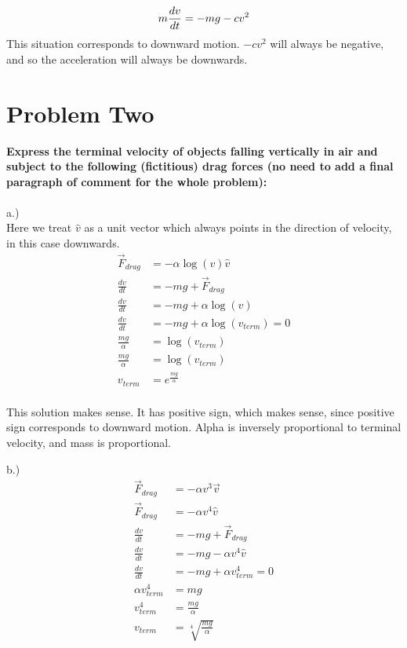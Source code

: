\documentclass[10pt]{article} %
\begin{document}
\begin{equation}
  m\frac{dv}{dt} = -mg - cv^2\\
\end{equation}
This situation corresponds to downward motion. $-cv^2$ will always be negative, and so the acceleration will always be downwards.\\

\vspace{1 cm}

\section{Problem Two}
\textbf{Express  the  terminal  velocity  of  objects  falling  vertically  in  air  and  subject to the following (fictitious) drag  forces (no need to add a  final paragraph of comment  for the whole problem):} \\ \\

a.)\\
Here we treat $\hat{v}$ as a unit vector which always points in the direction of velocity, in this case downwards.\\

\begin{align}
  \vec{F}_{drag} &= -\alpha\log(v)\hat{v}\\
  \frac{dv}{dt} &= -mg + \vec{F}_{drag}\\
  \frac{dv}{dt} &= -mg + \alpha\log(v)\\  
  \frac{dv}{dt} &= -mg + \alpha\log(v_{term}) = 0\\
  \frac{mg}{\alpha} &= \log(v_{term})\\
  \frac{mg}{\alpha} &= \log(v_{term})\\
  v_{term} &= e^{\frac{mg}{\alpha}}\\
\end{align}

This solution makes sense. It has positive sign, which makes sense, since positive sign corresponds to downward motion. Alpha is inversely proportional to terminal velocity, and mass is proportional.

b.)
\begin{align}
  \vec{F}_{drag} &= -\alpha v^3\vec{v}\\
  \vec{F}_{drag} &= -\alpha v^4\hat{v}\\  
  \frac{dv}{dt} &= -mg + \vec{F}_{drag}\\
  \frac{dv}{dt} &= -mg -\alpha v^4\hat{v}\\
  \frac{dv}{dt} &= -mg +\alpha v_{term}^4 = 0\\
  \alpha v_{term}^4 &= mg\\
  v_{term}^4 &= \frac{mg}{\alpha}\\
  v_{term} &= \sqrt[4]{\frac{mg}{\alpha}}\\
\end{align}
\end{document}
